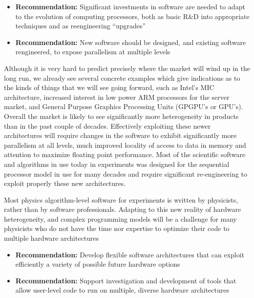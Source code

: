 \begin{itemize}
\item[] {\bf Recommendation:} Significant investments in software
are needed to adapt to the evolution of computing processors, both
as basic R\&D into appropriate techniques and as reengineering
``upgrades''
\item[] {\bf Recommendation:} New software should be designed, and 
existing software rengineered, to expose parallelism at multiple levels
\end{itemize}


Although it is very hard to predict precisely where the market will wind up
in the long run, we already see several concrete examples which give
indications as to the kinds of things that we will see going forward, such
as Intel's MIC architecture, increased interest in low power ARM processors
for the server market, and General Purpose Graphics Processing Units 
(GPGPU's or GPU's). Overall the market is likely to see significantly more 
heterogeneity in products than in the past couple of decades. Effectively 
exploiting these newer architectures will require changes in the software
to exhibit significantly more parallelism at all levels, much improved locality
of access to data in memory and attention to maximize floating point
performance. Most of the scientific software and algorithms
in use today in experiments was designed for the sequential processor
model in use for many decades and require significant re-engineering to 
exploit properly these new architectures.

Most physics algorithm-level software for experiments is written by
physicists, rather than by software professionals. Adapting to this new
reality of hardware heterogeneity, and complex programming models will
be a challenge for many physicists who do not have the time nor
expertise to optimize their code to multiple hardware architectures

\begin{itemize}
\item[] {\bf Recommendation:} Develop flexible software architectures that can exploit efficiently a variety of possible future hardware options
\item[] {\bf Recommendation:} Support investigation and development of tools that allow user-level code to run on multiple, diverse hardware architectures
\end{itemize}

